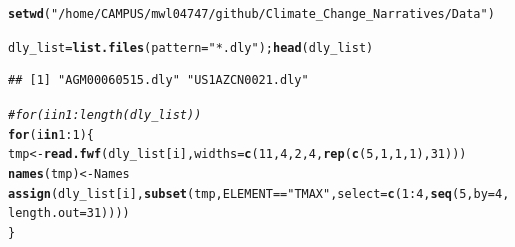 \documentclass{article}\usepackage[]{graphicx}\usepackage[]{color}
\makeatletter
\newcommand{\hlnum}[1]{\textcolor[rgb]{0.686,0.059,0.569}{#1}}%
\newcommand{\hlstr}[1]{\textcolor[rgb]{0.192,0.494,0.8}{#1}}%
\newcommand{\hlcom}[1]{\textcolor[rgb]{0.678,0.584,0.686}{\textit{#1}}}%
\newcommand{\hlopt}[1]{\textcolor[rgb]{0,0,0}{#1}}%
\newcommand{\hlstd}[1]{\textcolor[rgb]{0.345,0.345,0.345}{#1}}%
\newcommand{\hlkwa}[1]{\textcolor[rgb]{0.161,0.373,0.58}{\textbf{#1}}}%
\newcommand{\hlkwb}[1]{\textcolor[rgb]{0.69,0.353,0.396}{#1}}%
\newcommand{\hlkwc}[1]{\textcolor[rgb]{0.333,0.667,0.333}{#1}}%
\newcommand{\hlkwd}[1]{\textcolor[rgb]{0.737,0.353,0.396}{\textbf{#1}}}%
\newenvironment{kframe}{%
 \def\at@end@of@kframe{}%
 \ifinner\ifhmode%
  \def\at@end@of@kframe{\end{minipage}}%
  \begin{minipage}{\columnwidth}%
 \fi\fi%
 \def\FrameCommand##1{\hskip\@totalleftmargin \hskip-\fboxsep
 \colorbox{shadecolor}{##1}\hskip-\fboxsep
     \hskip-\linewidth \hskip-\@totalleftmargin \hskip\columnwidth}%
 \MakeFramed {\advance\hsize-\width
   \@totalleftmargin\z@ \linewidth\hsize
   \@setminipage}}%
 {\par\unskip\endMakeFramed%
 \at@end@of@kframe}
\newenvironment{knitrout}{}{} %
\makeatother
\begin{document}
\begin{knitrout}
\color{fgcolor}\begin{kframe}
\begin{alltt}
\hlkwd{setwd}\hlstd{(}\hlstr{"/home/CAMPUS/mwl04747/github/Climate_Change_Narratives/Data"}\hlstd{)}

\hlstd{dly_list} \hlkwb{=} \hlkwd{list.files}\hlstd{(}\hlkwc{pattern}\hlstd{=}\hlstr{"*.dly"}\hlstd{);} \hlkwd{head}\hlstd{(dly_list)}
\end{alltt}
\begin{verbatim}
## [1] "AGM00060515.dly" "US1AZCN0021.dly"
\end{verbatim}
\begin{alltt}
\hlcom{#for (i in 1:length(dly_list)) }
\hlkwa{for} \hlstd{(i} \hlkwa{in} \hlnum{1}\hlopt{:}\hlnum{1}\hlstd{)\{}
\hlstd{tmp} \hlkwb{<-} \hlkwd{read.fwf}\hlstd{(dly_list[i],} \hlkwc{widths} \hlstd{=} \hlkwd{c}\hlstd{(}\hlnum{11}\hlstd{,} \hlnum{4}\hlstd{,} \hlnum{2}\hlstd{,} \hlnum{4}\hlstd{,} \hlkwd{rep}\hlstd{(}\hlkwd{c}\hlstd{(}\hlnum{5}\hlstd{,} \hlnum{1}\hlstd{,} \hlnum{1}\hlstd{,} \hlnum{1}\hlstd{),}\hlnum{31}\hlstd{)))}
\hlkwd{names}\hlstd{(tmp)} \hlkwb{<-} \hlstd{Names}
\hlkwd{assign}\hlstd{(dly_list[i],} \hlkwd{subset}\hlstd{(tmp, ELEMENT}\hlopt{==}\hlstr{"TMAX"}\hlstd{,} \hlkwc{select}\hlstd{=}\hlkwd{c}\hlstd{(}\hlnum{1}\hlopt{:}\hlnum{4}\hlstd{,} \hlkwd{seq}\hlstd{(}\hlnum{5}\hlstd{,} \hlkwc{by} \hlstd{=} \hlnum{4}\hlstd{,} \hlkwc{length.out}\hlstd{=}\hlnum{31}\hlstd{))))}
\hlstd{\}}



\end{alltt}
\end{kframe}
\end{knitrout}
\end{document}
